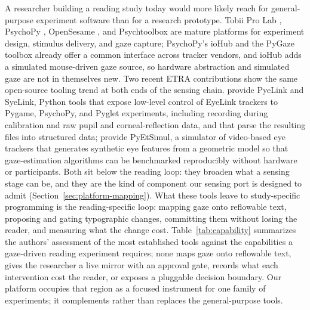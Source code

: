 A researcher building a reading study today would more likely reach for general-purpose experiment software than for a research prototype.
Tobii Pro Lab \cite{tobii2025prolab}, PsychoPy \cite{peirce2019psychopy}, OpenSesame \cite{mathot2012opensesame}, and Psychtoolbox \cite{brainard1997psychtoolbox} are mature platforms for experiment design, stimulus delivery, and gaze capture; PsychoPy's ioHub \cite{psychopy2026iohub} and the PyGaze toolbox \cite{dalmaijer2014pygaze} already offer a common interface across tracker vendors, and ioHub adds a simulated mouse-driven gaze source, so hardware abstraction and simulated gaze are not in themselves new.
Two recent ETRA contributions show the same open-source tooling trend at both ends of the sensing chain.
\citet{salari2026pyelink} provide PyeLink and SyeLink, Python tools that expose low-level control of EyeLink trackers to Pygame, PsychoPy, and Pyglet experiments, including recording during calibration and raw pupil and corneal-reflection data, and that parse the resulting files into structured data; \citet{salari2026pyetsimul} provide PyEtSimul, a simulator of video-based eye trackers that generates synthetic eye features from a geometric model so that gaze-estimation algorithms can be benchmarked reproducibly without hardware or participants.
Both sit below the reading loop: they broaden what a sensing stage can be, and they are the kind of component our sensing port is designed to admit (Section~\ref{sec:platform-mapping}).
What these tools leave to study-specific programming is the reading-specific loop: mapping gaze onto reflowable text, proposing and gating typographic changes, committing them without losing the reader, and measuring what the change cost.
Table~\ref{tab:capability} summarizes the authors' assessment of the most established tools against the capabilities a gaze-driven reading experiment requires; none maps gaze onto reflowable text, gives the researcher a live mirror with an approval gate, records what each intervention cost the reader, or exposes a pluggable decision boundary.
Our platform occupies that region as a focused instrument for one family of experiments; it complements rather than replaces the general-purpose tools.

